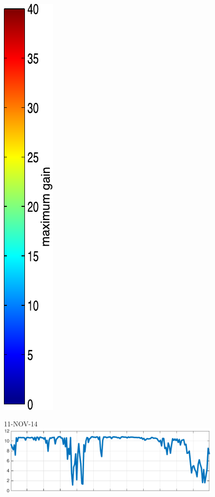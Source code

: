 \begin{figure}
\begin{minipage}[c]{\mylength}
\includegraphics[valign=t,trim=2pt -8pt 0 5pt,width=\colorbarwidth,totalheight=\eventheight]{events/colorbar-40.pdf}
\end{minipage}
\begin{minipage}[c]{\mylength}
\centering \scriptsize 11-NOV-14 \\
\includegraphics[valign=t,trim=0 0 5pt 0,angle=90,origin=tr,width=\sunintwidth,totalheight=\eventheight]{events/20141111-intensity.pdf}

\end{minipage}
\end{figure}
